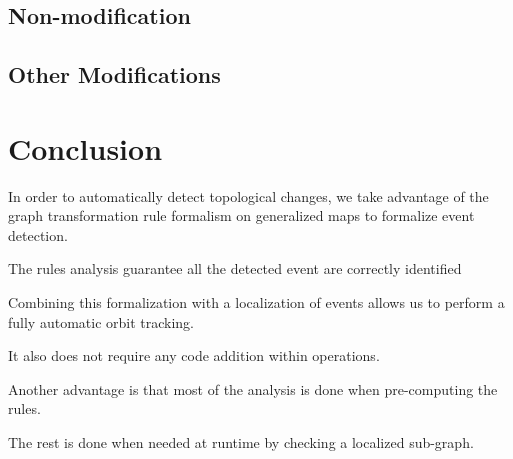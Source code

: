 \documentclass[11pt]{article}
\begin{document}
\subsection{Non-modification}
\label{sec:org6e6e295}
\subsection{Other Modifications}
\label{sec:orgccb514c}

\section{Conclusion}
\label{sec:org091f00f}
In order to automatically detect topological changes, we take advantage of the
graph transformation rule formalism on generalized maps to formalize event
detection.

The rules analysis guarantee all the detected event are correctly identified

Combining this formalization with a localization of events allows us to perform
a fully automatic orbit tracking.

It also does not require any code addition within operations.

Another advantage is that most of the analysis is done when pre-computing the
rules.

The rest is done when needed at runtime by checking a localized sub-graph.
\end{document}
